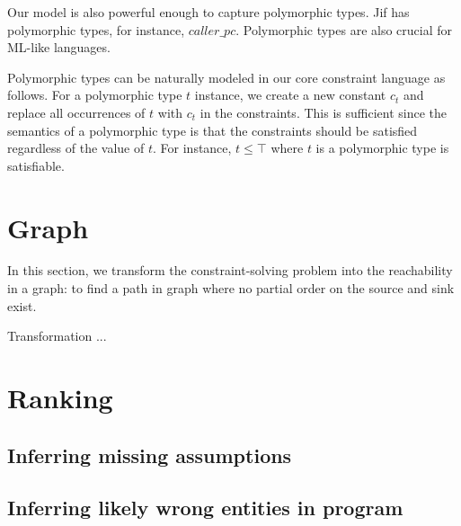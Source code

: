Our model is also powerful enough to capture polymorphic types.  Jif
has polymorphic types, for instance, $caller\_pc$. Polymorphic types
are also crucial for ML-like languages.

Polymorphic types can be naturally modeled in our core constraint
language as follows. For a polymorphic type $t$ instance, we create a
new constant $c_t$ and replace all occurrences of $t$ with $c_t$ in
the constraints. This is sufficient since the semantics of a
polymorphic type is that the constraints should be satisfied
regardless of the value of $t$. For instance, $t\leq \top$ where $t$
is a polymorphic type is satisfiable.

\section{Graph} 

In this section, we transform the constraint-solving problem into the
reachability in a graph: to find a path in graph where no partial order on the
source and sink exist. 

Transformation ... 

% 
% 
% 
% 
% 
% 
\section{Ranking}
\label{sec:ranking}

\subsection{Inferring missing assumptions}
\label{sec:assumptions}

\subsection{Inferring likely wrong entities in program}


